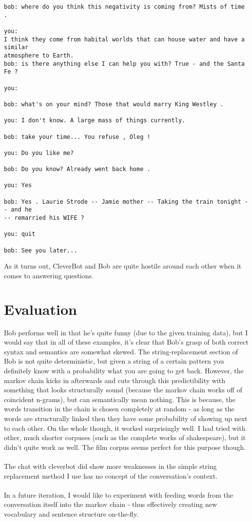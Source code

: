\documentclass[]{article}
\begin{document}
\begin{verbatim}
bob: where do you think this negativity is coming from? Mists of time .

you: 
I think they come from habital worlds that can house water and have a similar 
atmosphere to Earth.
bob: is there anything else I can help you with? True - and the Santa Fe ?

you: 

bob: what's on your mind? Those that would marry King Westley .

you: I don't know. A large mass of things currently.

bob: take your time... You refuse , Oleg !

you: Do you like me?

bob: Do you know? Already went back home .

you: Yes

bob: Yes . Laurie Strode -- Jamie mother -- Taking the train tonight -- and he 
-- remarried his WIFE ?

you: quit

bob: See you later...
\end{verbatim}

As it turns out, CleverBot and Bob are quite hostile around each other when it comes to answering questions.

\section{Evaluation}
Bob performs well in that he's quite funny (due to the given training data), but I would say that in all of these examples, it's clear that Bob's grasp of both correct syntax and semantics are somewhat skewed. The string-replacement section of Bob is not quite deterministic, but given a string of a certain pattern you definitely know with a probability what you are going to get back. However, the markov chain kicks in afterwards and cuts through this predictibility with something that looks structurally sound (because the markov chain works off of coincident n-grams), but can semantically mean nothing. This is because, the words transition in the chain is chosen completely at random - as long as the words are structurally linked then they have some probability of showing up next to each other. On the whole though, it worked surprisingly well. I had tried with other, much shorter corpuses (such as the complete works of shakespeare), but it didn't quite work as well. The film corpus seems perfect for this purpose though.
\\\\
The chat with cleverbot did show more weaknesses in the simple string replacement method I use has no concept of the conversation's context.
\\\\
In a future iteration, I would like to experiment with feeding words from the conversation itself into the markov chain - thus effectively creating new vocabulary and sentence structure on-the-fly.
\end{document}
